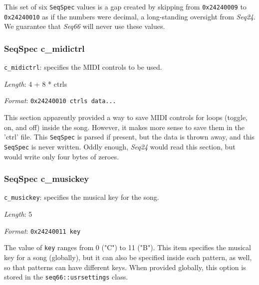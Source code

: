    This set of six
   \texttt{SeqSpec} values is a gap created by skipping from
   \texttt{0x24240009} to \texttt{0x24240010} as if the numbers were
   decimal, a long-standing oversight from \textsl{Seq24}.
   We guarantee that \textsl{Seq66} will never use these values.

\subsubsection{SeqSpec c\_midictrl}
\label{subsubsec:midi_format_track_seqspec_midictrl}

   \begin{description}
      \item \texttt{c\_midictrl}: specifies the MIDI controls to be used.
      \item \textsl{Length}: 4 + 8 * ctrls
      \item \textsl{Format}: \texttt{0x24240010 ctrls data...}
   \end{description}
   
   This section apparently provided a way to save MIDI controls for loops
   (toggle, on, and off) inside the song.  However, it makes more sense to
   save them in the 'ctrl' file.  This
   \texttt{SeqSpec} is parsed if present, but
   the data is thrown away, and this
   \texttt{SeqSpec} is never written.
   Oddly enough, \textsl{Seq24} would read this section, but would write only
   four bytes of zeroes.

\subsubsection{SeqSpec c\_musickey}
\label{subsubsec:midi_format_track_seqspec_musickey}

   \begin{description}
      \item \texttt{c\_musickey}: specifies the musical key for the song.
      \item \textsl{Length}: 5
      \item \textsl{Format}: \texttt{0x24240011 key}
   \end{description}

   The value of \texttt{key} ranges from 0 ("C") to 11 ("B").
   This item specifies the musical key for a song (globally), but it
   can also be specified inside each pattern, as well, so that patterns
   can have different keys.
   When provided globally, this option is stored in the
   \texttt{seq66::usrsettings} class.

